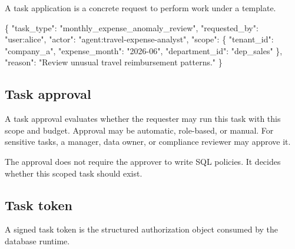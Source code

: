 \documentclass[journal]{IEEEtran}
\newenvironment{Shaded}{}{}
\newcommand{\DataTypeTok}[1]{\textcolor[rgb]{0.56,0.13,0.00}{#1}}
\newcommand{\FunctionTok}[1]{\textcolor[rgb]{0.02,0.16,0.49}{#1}}
\newcommand{\StringTok}[1]{\textcolor[rgb]{0.25,0.44,0.63}{#1}}
\begin{document}
A task application is a concrete request to perform work under a
template.

\begin{Shaded}
\begin{Highlighting}[]
\FunctionTok{\{}
  \DataTypeTok{"task\_type"}\FunctionTok{:} \StringTok{"monthly\_expense\_anomaly\_review"}\FunctionTok{,}
  \DataTypeTok{"requested\_by"}\FunctionTok{:} \StringTok{"user:alice"}\FunctionTok{,}
  \DataTypeTok{"actor"}\FunctionTok{:} \StringTok{"agent:travel{-}expense{-}analyst"}\FunctionTok{,}
  \DataTypeTok{"scope"}\FunctionTok{:} \FunctionTok{\{}
    \DataTypeTok{"tenant\_id"}\FunctionTok{:} \StringTok{"company\_a"}\FunctionTok{,}
    \DataTypeTok{"expense\_month"}\FunctionTok{:} \StringTok{"2026{-}06"}\FunctionTok{,}
    \DataTypeTok{"department\_id"}\FunctionTok{:} \StringTok{"dep\_sales"}
  \FunctionTok{\},}
  \DataTypeTok{"reason"}\FunctionTok{:} \StringTok{"Review unusual travel reimbursement patterns."}
\FunctionTok{\}}
\end{Highlighting}
\end{Shaded}

\hypertarget{task-approval}{%
\subsection{Task approval}\label{task-approval}}

A task approval evaluates whether the requester may run this task with
this scope and budget. Approval may be automatic, role-based, or manual.
For sensitive tasks, a manager, data owner, or compliance reviewer may
approve it.

The approval does not require the approver to write SQL policies. It
decides whether this scoped task should exist.

\hypertarget{task-token}{%
\subsection{Task token}\label{task-token}}

A signed task token is the structured authorization object consumed by
the database runtime.
\end{document}
